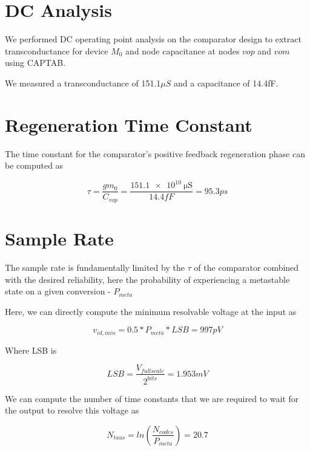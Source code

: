 \documentclass[letterpaper, notitlepage]{revtex4-1}
\begin{document}
\section{DC Analysis}
  We performed DC operating point analysis on the comparator design to extract
  transconductance for device $M_{0}$ and node capacitance at nodes $vop$ and
  $vom$ using CAPTAB.

  We measured a transconductance of 151.1${\mu S}$ and a capacitance of 14.4fF.

\section{Regeneration Time Constant}
  The time constant for the comparator's positive feedback regeneration phase
  can be computed as

  \begin{equation}
    \tau = \frac{gm_0}{C_{vop}} = \frac{\SI{151.1e10}{\micro\siemens}}{14.4fF} = 95.3ps
  \end{equation}

\section{Sample Rate}
  The sample rate is fundamentally limited by the $\tau$ of the comparator
  combined with the desired reliability, here the probability of experiencing
  a metastable state on a given conversion - ${P_{meta}}$

  Here, we can directly compute the minimum resolvable voltage at the input as

  \begin{equation}
    v_{id,min} = 0.5 * P_{meta} * LSB = 997pV
  \end{equation}

  Where LSB is

  \begin{equation}
    LSB = \frac{V_{fullscale}}{2^{bits}} = 1.953mV
  \end{equation}

  We can compute the number of time constants that we are required to wait for
  the output to resolve this voltage as

  \begin{equation}
    N_{taus} = ln(\frac{N_{codes}}{P_{meta}}) = 20.7
  \end{equation}
\end{document}
